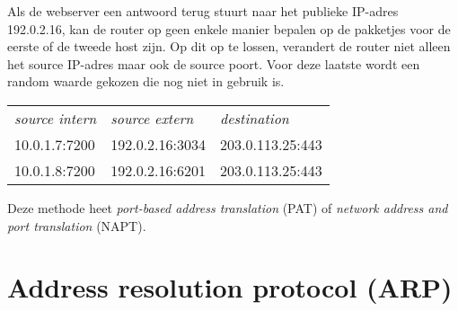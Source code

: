 \begin{enumerate}
\begin{center}
\begin{tabular}{lll}
   \end{tabular}
   \end{center}
   Als de webserver een antwoord terug stuurt naar het publieke IP-adres 192.0.2.16, kan de router op geen enkele manier bepalen op de pakketjes voor de eerste of de tweede host zijn.
   Op dit op te lossen, verandert de router niet alleen het source IP-adres maar ook de source poort.
   Voor deze laatste wordt een random waarde gekozen die nog niet in gebruik is.
   \begin{center}
   \begin{tabular}{lll}
   \textit{source intern} & \textit{source extern} & \textit{destination} \\[1ex]
   10.0.1.7:7200          & 192.0.2.16:3034        & 203.0.113.25:443 \\
   10.0.1.8:7200          & 192.0.2.16:6201        & 203.0.113.25:443 \\
   \end{tabular}
   \end{center}
   Deze methode heet \emph{port-based address translation} (PAT) of \emph{network address and port translation} (NAPT).
\end{enumerate}



\section{Address resolution protocol (ARP)}
\label{sec:arp}

